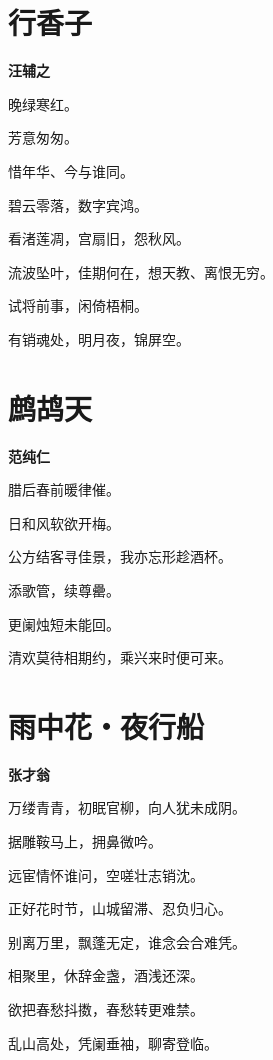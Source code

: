 \documentclass[12pt,a4paper]{ctexbook}
\begin{document}
\section{行香子}
\textbf{汪辅之}\par\vspace{0.5em}
晚绿寒红。\par
芳意匆匆。\par
惜年华、今与谁同。\par
碧云零落，数字宾鸿。\par
看渚莲凋，宫扇旧，怨秋风。\par
流波坠叶，佳期何在，想天教、离恨无穷。\par
试将前事，闲倚梧桐。\par
有销魂处，明月夜，锦屏空。\par

\section{鹧鸪天}
\textbf{范纯仁}\par\vspace{0.5em}
腊后春前暖律催。\par
日和风软欲开梅。\par
公方结客寻佳景，我亦忘形趁酒杯。\par
添歌管，续尊罍。\par
更阑烛短未能回。\par
清欢莫待相期约，乘兴来时便可来。\par

\section{雨中花・夜行船}
\textbf{张才翁}\par\vspace{0.5em}
万缕青青，初眠官柳，向人犹未成阴。\par
据雕鞍马上，拥鼻微吟。\par
远宦情怀谁问，空嗟壮志销沈。\par
正好花时节，山城留滞、忍负归心。\par
别离万里，飘蓬无定，谁念会合难凭。\par
相聚里，休辞金盏，酒浅还深。\par
欲把春愁抖擞，春愁转更难禁。\par
乱山高处，凭阑垂袖，聊寄登临。\par
\end{document}

